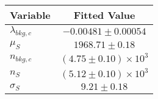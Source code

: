 \begin{tabular}[t]{lc}
\hline
Variable &Fitted Value\\
\hline\hline
$\lambda_{bkg,c}$&$-0.00481\pm0.00054$\\
\hline
$\mu_{S}$&$1968.71\pm0.18$\\
\hline
$n_{bkg,c}$&$(4.75\pm0.10)\times 10^3$\\
\hline
$n_{S}$&$(5.12\pm0.10)\times 10^3$\\
\hline
$\sigma_{S}$&$9.21\pm0.18$\\
\hline
\end{tabular}